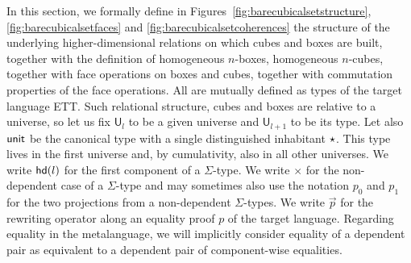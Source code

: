 \documentclass{article}
\newcommand{\sort}[1]{\mathsf{U}_{#1}}
\begin{document}
In this section, we formally define in
Figures~\ref{fig:barecubicalsetstructure},
\ref{fig:barecubicalsetfaces} and \ref{fig:barecubicalsetcoherences}
the structure of the underlying higher-dimensional relations on which
cubes and boxes are built, together with the definition of homogeneous
$n$-boxes, homogeneous $n$-cubes, together with face operations on
boxes and cubes, together with commutation properties of the face
operations. All are mutually defined as types of the target language
ETT. Such relational structure, cubes and boxes are relative to a
universe, so let us fix $\sort{l}$ to be a given universe and
$\sort{l+1}$ to be its type. Let also $\mathsf{unit}$ be the canonical
type with a single distinguished inhabitant $\star$. This type
lives in the first universe and, by cumulativity, also in all other
universes. We write $\mathsf{hd}(l)$ for the first component of a
$\Sigma$-type. We write $\times$ for the non-dependent case of a
$\Sigma$-type and may sometimes also use the notation $p_0$ and $p_1$
for the two projections from a non-dependent $\Sigma$-types. We write
$\overrightarrow{p}$ for the rewriting operator along an equality
proof $p$ of the target language. Regarding equality in the
metalanguage, we will implicitly consider equality of a dependent pair
as equivalent to a dependent pair of component-wise equalities.
\end{document}
